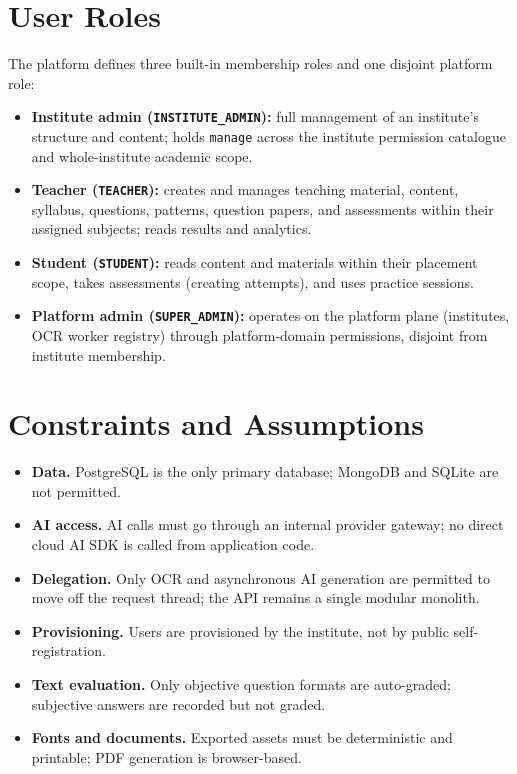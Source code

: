 \section{User Roles}

\noindent The platform defines three built-in membership roles and one
disjoint platform role:

\begin{itemize}
  \item \textbf{Institute admin (\texttt{INSTITUTE\_ADMIN}):} full management
  of an institute's structure and content; holds \texttt{manage} across the
  institute permission catalogue and whole-institute academic scope.
  \item \textbf{Teacher (\texttt{TEACHER}):} creates and manages teaching
  material, content, syllabus, questions, patterns, question papers, and
  assessments within their assigned subjects; reads results and analytics.
  \item \textbf{Student (\texttt{STUDENT}):} reads content and materials within
  their placement scope, takes assessments (creating attempts), and uses
  practice sessions.
  \item \textbf{Platform admin (\texttt{SUPER\_ADMIN}):} operates on the
  platform plane (institutes, OCR worker registry) through platform-domain
  permissions, disjoint from institute membership.
\end{itemize}

\section{Constraints and Assumptions}

\begin{itemize}
  \item \textbf{Data.} PostgreSQL is the only primary database; MongoDB and
  SQLite are not permitted.
  \item \textbf{AI access.} AI calls must go through an internal provider
  gateway; no direct cloud AI SDK is called from application code.
  \item \textbf{Delegation.} Only OCR and asynchronous AI generation are
  permitted to move off the request thread; the API remains a single
  modular monolith.
  \item \textbf{Provisioning.} Users are provisioned by the institute, not by
  public self-registration.
  \item \textbf{Text evaluation.} Only objective question formats are
  auto-graded; subjective answers are recorded but not graded.
  \item \textbf{Fonts and documents.} Exported assets must be deterministic and
  printable; PDF generation is browser-based.
\end{itemize}

